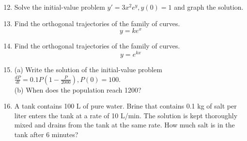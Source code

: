 \documentclass[12pt, a4paper]{article}
\begin{document}
\begin{enumerate}
    \setcounter{enumi}{11} %
    \item Solve the initial-value problem $y' = 3x^2e^y, y(0)=1$ and graph the solution.
    
    \item Find the orthogonal trajectories of the family of curves.
    \[ y = ke^x \]
    
    \item Find the orthogonal trajectories of the family of curves.
    \[ y = e^{kx} \]
    
    \item (a) Write the solution of the initial-value problem $\frac{dP}{dt} = 0.1P(1 - \frac{P}{2000}), P(0)=100$. \\
    (b) When does the population reach 1200?
    
    \setcounter{enumi}{17} %
    \item A tank contains 100 L of pure water. Brine that contains 0.1 kg of salt per liter enters the tank at a rate of 10 L/min. The solution is kept thoroughly mixed and drains from the tank at the same rate. How much salt is in the tank after 6 minutes?

\end{enumerate}
\end{document}
